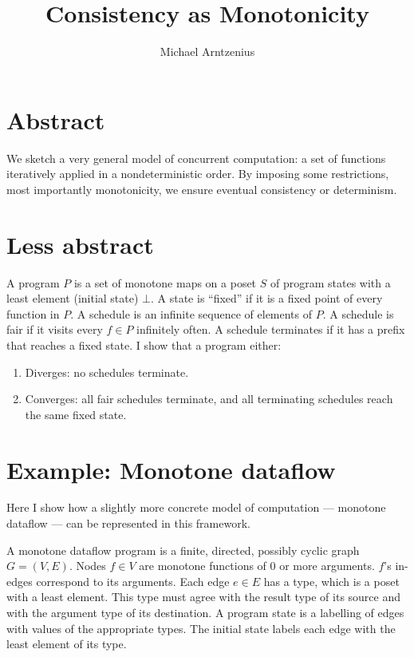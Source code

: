 \documentclass{article}
\begin{document}
\title{Consistency as Monotonicity}
\author{Michael Arntzenius}
\date{}
\maketitle


\section{Abstract}

We sketch a very general model of concurrent computation: a set of functions
iteratively applied in a nondeterministic order. By imposing some restrictions,
most importantly monotonicity, we ensure eventual consistency or determinism.


\section{Less abstract}
\label{sec:less-abstract}

A program $P$ is a set of monotone maps on a poset $S$ of program states with a
least element (initial state) $\bot$. A state is ``fixed'' if it is a fixed
point of every function in $P$. A schedule is an infinite sequence of elements
of $P$. A schedule is fair if it visits every $f \in P$ infinitely often. A
schedule terminates if it has a prefix that reaches a fixed state. I show that a
program either:

\begin{enumerate}
\item Diverges: no schedules terminate.
\item Converges: all fair schedules terminate, and all terminating schedules
  reach the same fixed state.
\end{enumerate}


\section{Example: Monotone dataflow}

Here I show how a slightly more concrete model of computation --- monotone
dataflow --- can be represented in this framework.

A monotone dataflow program is a finite, directed, possibly cyclic graph $G =
(V,E)$. Nodes $f \in V$ are monotone functions of 0 or more arguments. $f$'s
in-edges correspond to its arguments. Each edge $e \in E$ has a type, which is a
poset with a least element. This type must agree with the result type of its
source and with the argument type of its destination. A program state is a
labelling of edges with values of the appropriate types. The initial state
labels each edge with the least element of its type.
\end{document}
